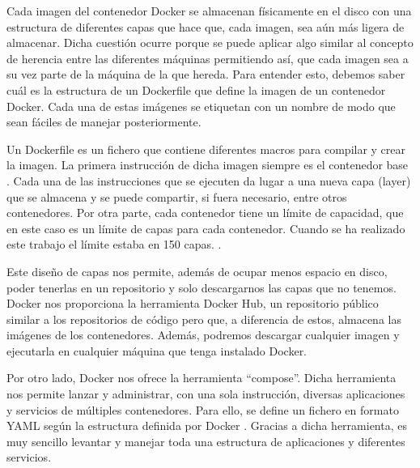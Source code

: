 Cada imagen del contenedor Docker se almacenan físicamente en el disco con
una estructura de diferentes capas que hace que, cada imagen, sea aún más
ligera de almacenar. Dicha cuestión ocurre porque se puede aplicar algo
similar al concepto de herencia entre las diferentes máquinas permitiendo
así, que cada imagen sea a su vez parte de la máquina de la que hereda.
Para entender esto, debemos saber cuál es la estructura de un Dockerfile
que define la imagen de un contenedor Docker. Cada una de estas imágenes se
etiquetan con un nombre de modo que sean fáciles de manejar posteriormente.

Un Dockerfile es un fichero que contiene diferentes macros para compilar y
crear la imagen. La primera instrucción de dicha imagen siempre es el
contenedor base \cite{Dck-11}. Cada una de las instrucciones que se
ejecuten da lugar a una nueva capa (layer) que se almacena y se puede
compartir, si fuera necesario, entre otros contenedores. Por otra parte,
cada contenedor tiene un límite de capacidad, que en este caso es un límite
de capas para cada contenedor. Cuando se ha realizado este trabajo el
límite estaba en 150 capas. \cite{Dck-12}.

Este diseño de capas nos permite, además de ocupar menos espacio en disco,
poder tenerlas en un repositorio y solo descargarnos las capas que no
tenemos. Docker nos proporciona la herramienta Docker Hub, un repositorio
público similar a los repositorios de código pero que, a diferencia de
estos, almacena las imágenes de los contenedores. Además, podremos
descargar cualquier imagen y ejecutarla en cualquier máquina que tenga
instalado Docker.

Por otro lado, Docker nos ofrece la herramienta “compose”. Dicha
herramienta nos permite lanzar y administrar, con una sola instrucción,
diversas aplicaciones y servicios de múltiples contenedores. Para ello, se
define un fichero en formato YAML según la estructura definida por Docker
\cite{Dck-13}. Gracias a dicha herramienta, es muy sencillo levantar y
manejar toda una estructura de aplicaciones y diferentes servicios.

